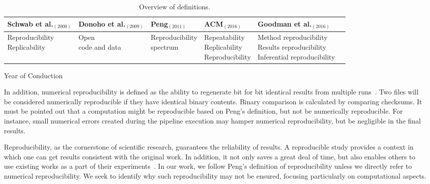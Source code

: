 \setlength{\tabcolsep}{1pt}
\begin{table}[H]
\hspace*{-1cm}
\caption{Overview of definitions.}
\label{table:definitions}
\centering
\begin{threeparttable}
\begin{tabular}{@{}llllll@{}}
\toprule
Schwab et al.$_{(2000)}$ & Donoho et al.$_{(2009)}$ & Peng$_{(2011)}$ & 
ACM$_{(2016)}$ & Goodman et al.$_{(2016)}$ \\ \midrule
\makecell{Reproducibility \\ Replicability} &   \makecell{Open \\ code 
and data} &   \makecell{Reproducibility \\ spectrum}  &   
\makecell{Repeatability \\ Replicability \\ Reproducibility} & 
\makecell{Method reproducibility \\ Results reproducibility \\ Inferential reproducibility}    \\ \bottomrule
\end{tabular}
\begin{tablenotes}
      \small
      \item *Year of Conduction
\end{tablenotes}
\end{threeparttable}
\end{table}

In addition, numerical reproducibility is defined as the ability to 
regenerate bit for bit identical results from multiple 
runs~\cite{hill2017numerical}. Two files will be considered numerically 
reproducible if they have identical binary contents. Binary 
comparison is calculated by comparing checksums. It must be pointed out 
that a computation might be reproducible based on Peng's definition, 
but not be numerically reproducible. For instance, small numerical 
errors created during the pipeline execution may hamper numerical 
reproducibility, but be negligible in the final results.

Reproducibility, as the cornerstone of scientific research, guarantees 
the reliability of results. A reproducible study provides a context in which one can get results consistent with the original work.
In addition, it not only saves a great deal of time, but also 
enables others to use existing works as a part of their 
experiments~\cite{plesser2018reproducibility}. 
In our work, we follow Peng's definition of reproducibility 
unless we directly refer to numerical reproducibility. 
We seek to identify why such reproducibility may not be ensured, focusing particularly on computational aspects.

